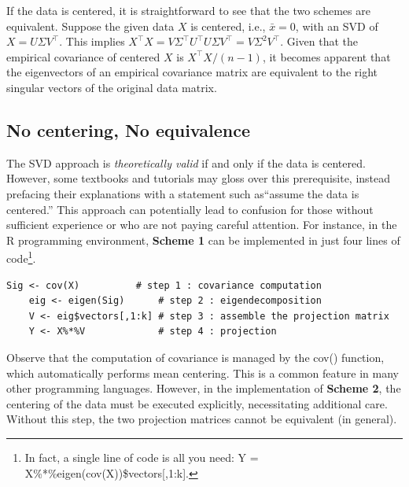 \documentclass[11pt]{article}
\begin{document}
If the data is centered, it is straightforward to see that the two schemes are equivalent. Suppose the given data $X$ is centered, i.e., $\bar{x} = 0$, with an SVD of $X = U\Sigma V^\top$. This implies $X^\top X = V \Sigma^\top U^\top U \Sigma V^\top = V \Sigma^2 V^\top$. Given that the empirical covariance of centered $X$ is $X^\top X / (n-1)$, it becomes apparent that the eigenvectors of an empirical covariance matrix are equivalent to the right singular vectors of the original data matrix.


\subsection{No centering, No equivalence}\label{subsec:noequivalence}



The SVD approach is \textit{theoretically valid} if and only if the data is centered. However, some textbooks and tutorials may gloss over this prerequisite, instead prefacing their explanations with a statement such as``assume the data is centered.'' This approach can potentially lead to confusion for those without sufficient experience or who are not paying careful attention.
For instance, in the \textsf{R} programming environment, \textbf{Scheme 1} can be implemented in just four lines of code\footnote{In fact, a single line of code is all you need: {\ttfamily Y = X\%*\%eigen(cov(X))\$vectors[,1:k]}.}.


\begin{lstlisting}[title={Implementation of \textbf{Scheme 1} using \textsf{R}.}, label=code:scheme1]
	Sig <- cov(X)          # step 1 : covariance computation 
	eig <- eigen(Sig)      # step 2 : eigendecomposition
	V <- eig$vectors[,1:k] # step 3 : assemble the projection matrix
	Y <- X%*%V             # step 4 : projection
\end{lstlisting}



Observe that the computation of covariance is managed by the {\ttfamily cov()} function, which automatically performs mean centering. This is a common feature in many other programming languages. However, in the implementation of \textbf{Scheme 2}, the centering of the data must be executed explicitly, necessitating additional care. Without this step, the two projection matrices cannot be equivalent (in general).
\end{document}
